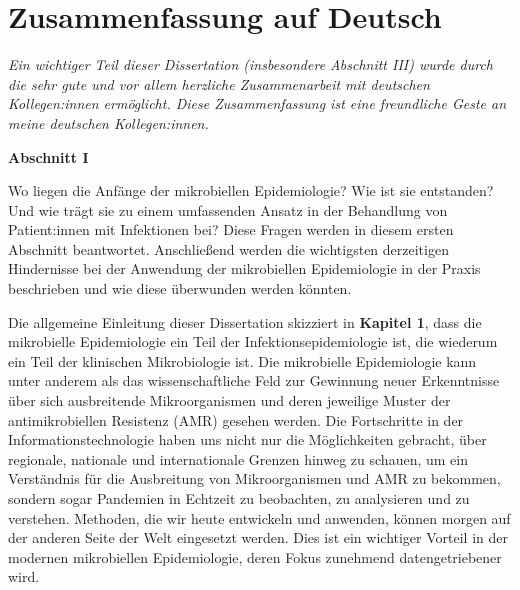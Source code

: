 \documentclass[
]{book}
\begin{document}
\hypertarget{zusammenfassung-auf-deutsch}{%
\chapter*{Zusammenfassung auf Deutsch}\label{zusammenfassung-auf-deutsch}}

\emph{Ein wichtiger Teil dieser Dissertation (insbesondere Abschnitt III) wurde durch die sehr gute und vor allem herzliche Zusammenarbeit mit deutschen Kollegen:innen ermöglicht. Diese Zusammenfassung ist eine freundliche Geste an meine deutschen Kollegen:innen.}

\textbf{Abschnitt I}

Wo liegen die Anfänge der mikrobiellen Epidemiologie? Wie ist sie entstanden? Und wie trägt sie zu einem umfassenden Ansatz in der Behandlung von Patient:innen mit Infektionen bei? Diese Fragen werden in diesem ersten Abschnitt beantwortet. Anschließend werden die wichtigsten derzeitigen Hindernisse bei der Anwendung der mikrobiellen Epidemiologie in der Praxis beschrieben und wie diese überwunden werden könnten.

Die allgemeine Einleitung dieser Dissertation skizziert in \textbf{Kapitel 1}, dass die mikrobielle Epidemiologie ein Teil der Infektionsepidemiologie ist, die wiederum ein Teil der klinischen Mikrobiologie ist. Die mikrobielle Epidemiologie kann unter anderem als das wissenschaftliche Feld zur Gewinnung neuer Erkenntnisse über sich ausbreitende Mikroorganismen und deren jeweilige Muster der antimikrobiellen Resistenz (AMR) gesehen werden. Die Fortschritte in der Informationstechnologie haben uns nicht nur die Möglichkeiten gebracht, über regionale, nationale und internationale Grenzen hinweg zu schauen, um ein Verständnis für die Ausbreitung von Mikroorganismen und AMR zu bekommen, sondern sogar Pandemien in Echtzeit zu beobachten, zu analysieren und zu verstehen. Methoden, die wir heute entwickeln und anwenden, können morgen auf der anderen Seite der Welt eingesetzt werden. Dies ist ein wichtiger Vorteil in der modernen mikrobiellen Epidemiologie, deren Fokus zunehmend datengetriebener wird.
\end{document}
